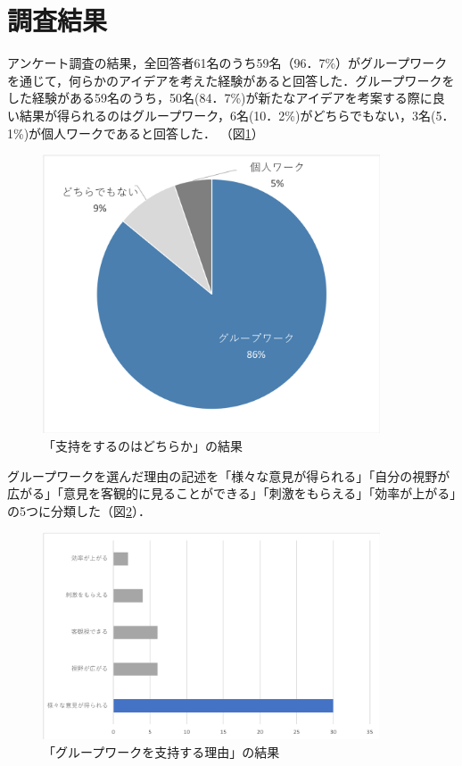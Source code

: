 \documentclass{funthesis}
\begin{document}
\section{調査結果}

アンケート調査の結果，全回答者61名のうち59名（96．7\%）がグループワークを通じて，何らかのアイデアを考えた経験があると回答した．グループワークをした経験がある59名のうち，50名(84．7\%)が新たなアイデアを考案する際に良い結果が得られるのはグループワーク，6名(10．2\%)がどちらでもない，3名(5．1\%)が個人ワークであると回答した．
（図\ref{graph0}）
\begin{figure}[H]
 \centering
   \includegraphics[width=100mm]{figures/finalchart1.png}
 \caption{「支持をするのはどちらか」の結果}
 \label{graph0}
\end{figure}

グループワークを選んだ理由の記述を「様々な意見が得られる」「自分の視野が広がる」「意見を客観的に見ることができる」「刺激をもらえる」「効率が上がる」の5つに分類した（図\ref{graph1}）．
\begin{figure}[H]
 \centering
   \includegraphics[width=100mm]{figures/finalchart5.png}
 \caption{「グループワークを支持する理由」の結果}
 \label{graph1}
\end{figure}
\end{document}

